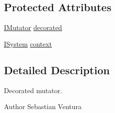 \subsection*{Protected Attributes}
\begin{DoxyCompactItemize}
\item 
\hyperlink{interfacenet_1_1sf_1_1jclec_1_1_i_mutator}{I\-Mutator} \hyperlink{classnet_1_1sf_1_1jclec_1_1base_1_1_decorated_mutator_a3eb423e738412ac288f0b37381e685f2}{decorated}
\item 
\hyperlink{interfacenet_1_1sf_1_1jclec_1_1_i_system}{I\-System} \hyperlink{classnet_1_1sf_1_1jclec_1_1base_1_1_decorated_mutator_a0f500ae1072a9663fa96475891c074bc}{context}
\end{DoxyCompactItemize}


\subsection{Detailed Description}
Decorated mutator.

\begin{DoxyAuthor}{Author}
Sebastian Ventura 
\end{DoxyAuthor}


